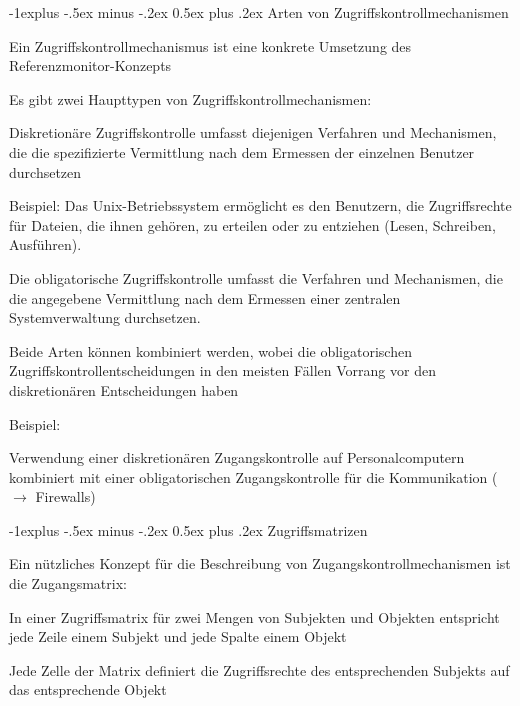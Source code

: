\documentclass[a4paper]{article}
\makeatletter
\renewcommand{\subsection}{\@startsection{subsection}{2}{0mm}%
 {-1explus -.5ex minus -.2ex}%
 {0.5ex plus .2ex}%
 {\normalfont\normalsize\bfseries}}
\makeatother
\begin{document}
\begin{multicols}{3}
      \subsection{Arten von Zugriffskontrollmechanismen}
      \begin{itemize*}
            \item Ein Zugriffskontrollmechanismus ist eine konkrete Umsetzung des Referenzmonitor-Konzepts
            \item Es gibt zwei Haupttypen von Zugriffskontrollmechanismen:
            \begin{itemize*}
                  \item Diskretionäre Zugriffskontrolle umfasst diejenigen Verfahren und Mechanismen, die die spezifizierte Vermittlung nach dem Ermessen der einzelnen Benutzer durchsetzen
                  \begin{itemize*}
                        \item Beispiel: Das Unix-Betriebssystem ermöglicht es den Benutzern, die Zugriffsrechte für Dateien, die ihnen gehören, zu erteilen oder zu entziehen (Lesen, Schreiben, Ausführen).
                  \end{itemize*}
                  \item Die obligatorische Zugriffskontrolle umfasst die Verfahren und Mechanismen, die die angegebene Vermittlung nach dem Ermessen einer zentralen Systemverwaltung durchsetzen.
            \end{itemize*}
            \item Beide Arten können kombiniert werden, wobei die obligatorischen Zugriffskontrollentscheidungen in den meisten Fällen Vorrang vor den diskretionären Entscheidungen haben
            \begin{itemize*}
                  \item Beispiel:
                  \item Verwendung einer diskretionären Zugangskontrolle auf Personalcomputern kombiniert mit einer obligatorischen Zugangskontrolle für die Kommunikation ($\rightarrow$ Firewalls)
            \end{itemize*}
      \end{itemize*}

      \subsection{Zugriffsmatrizen}
      \begin{itemize*}
            \item Ein nützliches Konzept für die Beschreibung von Zugangskontrollmechanismen ist die Zugangsmatrix:
            \begin{itemize*}
                  \item In einer Zugriffsmatrix für zwei Mengen von Subjekten und Objekten entspricht jede Zeile einem Subjekt und jede Spalte einem Objekt
                  \item Jede Zelle der Matrix definiert die Zugriffsrechte des entsprechenden Subjekts auf das entsprechende Objekt
            \end{itemize*}
      \end{itemize*}


\end{multicols}
\end{document}
